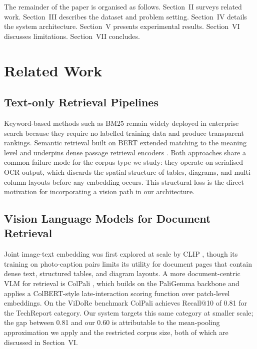 \documentclass[conference]{IEEEtran}
\begin{document}
The remainder of the paper is organised as follows. Section~II surveys related work. Section~III describes the dataset and problem setting. Section~IV details the system architecture. Section~V presents experimental results. Section~VI discusses limitations. Section~VII concludes.
 
\section{Related Work}
 
\subsection{Text-only Retrieval Pipelines}
Keyword-based methods such as BM25 \cite{robertson1994okapi, robertson2009} remain widely deployed in enterprise search because they require no labelled training data and produce transparent rankings. Semantic retrieval built on BERT \cite{devlin2019} extended matching to the meaning level and underpins dense passage retrieval encoders \cite{karpukhin2020dense}. Both approaches share a common failure mode for the corpus type we study: they operate on serialised OCR output, which discards the spatial structure of tables, diagrams, and multi-column layouts before any embedding occurs. This structural loss is the direct motivation for incorporating a vision path in our architecture.
 
\subsection{Vision Language Models for Document Retrieval}
Joint image-text embedding was first explored at scale by CLIP \cite{radford2021}, though its training on photo-caption pairs limits its utility for document pages that contain dense text, structured tables, and diagram layouts. A more document-centric VLM for retrieval is ColPali \cite{faysse2024colpali}, which builds on the PaliGemma backbone \cite{beyer2024paligemma} and applies a ColBERT-style \cite{khattab2020colbert} late-interaction scoring function over patch-level embeddings. On the ViDoRe benchmark \cite{faysse2024vidore} ColPali achieves Recall@10 of 0.81 for the TechReport category. Our system targets this same category at smaller scale; the gap between 0.81 and our 0.60 is attributable to the mean-pooling approximation we apply and the restricted corpus size, both of which are discussed in Section~VI.
 
\end{document}
